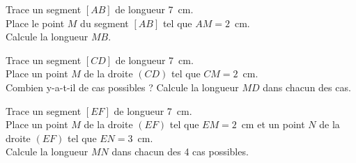 \begin{myenumerate}
\item Trace un segment $[AB]$ de longueur 7~cm.\\Place le point $M$
  du segment $[AB]$ tel que $AM=2$~cm.
\\Calcule la longueur $MB$.
\item Trace un segment $[CD]$ de longueur 7~cm.\\Place un point $M$
  de la droite $(CD)$ tel que $CM=2$~cm.
\\Combien y-a-t-il de cas possibles ? Calcule la longueur $MD$ dans
  chacun des cas.
\item Trace un segment $[EF]$ de longueur 7~cm.\\Place un point $M$
  de la droite $(EF)$ tel que $EM=2$~cm et un point $N$ de la droite
  $(EF)$ tel que $EN=3$~cm.\\Calcule la longueur $MN$ dans chacun des
  4 cas possibles.
\end{myenumerate} 